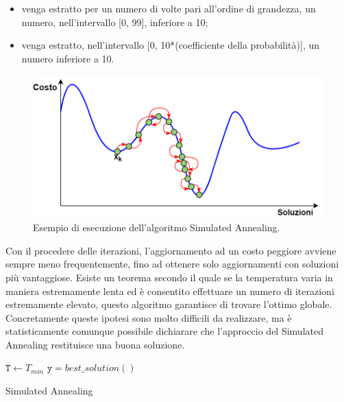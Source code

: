 \begin{itemize}
\item{venga estratto per un numero di volte pari all'ordine di grandezza, un numero, nell'intervallo [0, 99], inferiore a 10;}
\item{venga estratto, nell'intervallo [0, 10*(coefficiente della probabilità)], un numero inferiore a 10.}
\end{itemize} 
 \begin{figure}[H]
\begin{center} 
  \includegraphics[scale=0.43]{Images/simulated_anneling}
  \caption{\footnotesize{Esempio di esecuzione dell'algoritmo Simulated Annealing.}}
  \label{simulated_annealing}
\end{center}
\end{figure}
 Con il procedere delle iterazioni, l'aggiornamento ad un costo peggiore avviene sempre meno frequentemente, fino ad ottenere solo aggiornamenti con soluzioni più vantaggiose. Esiste un teorema secondo il quale se la temperatura varia in maniera estremamente lenta ed è consentito effettuare un numero di iterazioni estremamente elevato, questo algoritmo garantisce di trovare l'ottimo globale. Concretamente queste ipotesi sono molto difficili da realizzare, ma è statisticamente comunque possibile dichiarare che l'approccio del Simulated Annealing restituisce una buona soluzione.
 \begin{algorithm}[H]
\DontPrintSemicolon
{}
\BlankLine
$\mathtt{T} \gets T_{min}$\;
\BlankLine
{}
 \BlankLine
$\mathtt{y}= best\_solution()$\;
\caption{Simulated Annealing}
\end{algorithm}
